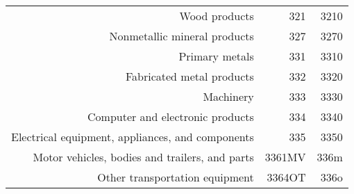 \begin{table}[H]
\begin{center}
\begin{tabular}{rrr}
Wood products                                                        & 321         & 3210      \\%
Nonmetallic mineral products                                         & 327         & 3270      \\%
Primary metals                                                       & 331         & 3310      \\%
Fabricated metal products                                            & 332         & 3320      \\%
Machinery                                                            & 333         & 3330      \\%
Computer and electronic products                                     & 334         & 3340      \\%
Electrical equipment, appliances, and components                     & 335         & 3350      \\%
Motor vehicles, bodies and trailers, and parts                       & 3361MV      & 336m      \\%
Other transportation equipment                                       & 3364OT      & 336o      \\%

\end{tabular}
\end{center}
\end{table}
